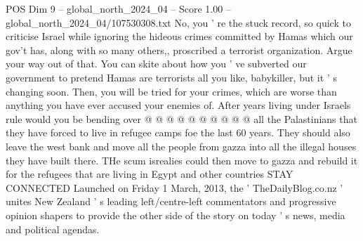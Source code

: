 \begin{textsample}{POS Dim 9 – global\_north\_2024\_04 – Score 1.00 – global\_north\_2024\_04/107530308.txt}
No, you ' re the stuck record, so quick to criticise Israel while ignoring the hideous crimes committed by Hamas which our gov't has, along with so many others,, proscribed a terrorist organization.
Argue your way out of that.
You can skite about how you ' ve subverted our government to pretend Hamas are terrorists all you like, babykiller, but it ' s changing soon.
Then, you will be tried for your crimes, which are worse than anything you have ever accused your enemies of.
After years living under Israels rule would you be bending over @ @ @ @ @ @ @ @ @ @ all the Palastinians that they have forced to live in refugee camps foe the last 60 years.
They should also leave the west bank and move all the people from gazza into all the illegal houses they have built there.
THe scum isrealies could then move to gazza and rebuild it for the refugees that are living in Egypt and other countries STAY CONNECTED Launched on Friday 1 March, 2013, the ' TheDailyBlog.co.nz ' unites New Zealand ' s leading left/centre-left commentators and progressive opinion shapers to provide the other side of the story on today ' s news, media and political agendas.

\end{textsample}
